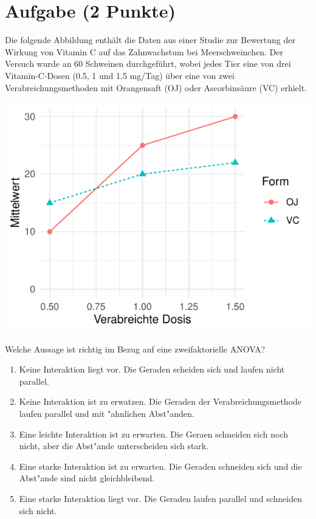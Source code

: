 \documentclass[a4paper, 10pt]{scrartcl}\usepackage[]{graphicx}\usepackage[]{xcolor}
\makeatletter
\def\maxwidth{ %
  \ifdim\Gin@nat@width>\linewidth
    \linewidth
  \else
    \Gin@nat@width
  \fi
}
\makeatother
\begin{document}
\section{Aufgabe \hfill (2 Punkte)}

Die folgende Abbildung enth{\"a}lt die Daten aus einer Studie zur
Bewertung der Wirkung von Vitamin C auf das Zahnwachstum bei
Meerschweinchen. Der Versuch wurde an 60 Schweinen durchgef{\"u}hrt, wobei
jedes Tier eine von drei Vitamin-C-Dosen (0.5, 1 und 1.5 mg/Tag) {\"u}ber eine
von zwei Verabreichungsmethoden mit Orangensaft (OJ)  oder
Ascorbins{\"a}ure (VC) erhielt. 



{\centering \includegraphics[width=\maxwidth]{img/mc-anova-02-a-1} 

}




Welche Aussage ist richtig im Bezug auf eine zweifaktorielle ANOVA?



\begin{enumerate}
\item [\textbf{A} \msquare] Keine Interaktion liegt vor. Die Geraden scheiden sich und laufen nicht parallel.
\item [\textbf{B} \msquare] Keine Interaktion ist zu erwatzen. Die Geraden der Verabreichungsmethode laufen parallel und mit {"a}hnlichen Abst{"a}nden.
\item [\textbf{C} \msquare] Eine leichte Interaktion ist zu erwarten. Die Geraen schneiden sich noch nicht, aber die Abst{"a}nde unterscheiden sich stark.
\item [\textbf{D} \msquare] Eine starke Interaktion ist zu erwarten. Die Geraden schneiden sich und die Abst{"a}nde sind nicht gleichbleibend.
\item [\textbf{E} \msquare] Eine starke Interaktion liegt vor. Die Geraden laufen parallel und schneiden sich nicht.
\end{enumerate} 
\end{document}
